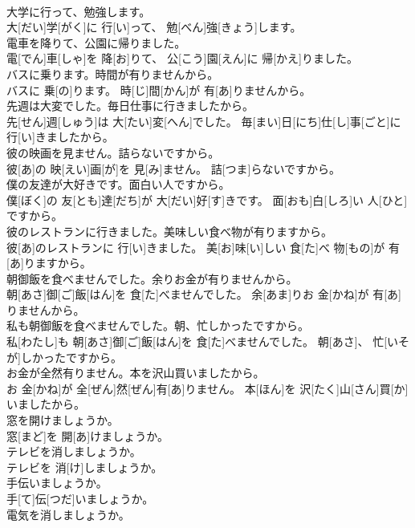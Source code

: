 \documentclass[8pt]{extreport}
\begin{document}
\begin{CJK}{UTF8}{min}
\\	大学に行って、勉強します。	
\\	大[だい]学[がく]に 行[い]って、 勉[べん]強[きょう]します。
\\	電車を降りて、公園に帰りました。	
\\	電[でん]車[しゃ]を 降[お]りて、 公[こう]園[えん]に 帰[かえ]りました。
\\	バスに乗ります。時間が有りませんから。	
\\	バスに 乗[の]ります。 時[じ]間[かん]が 有[あ]りませんから。
\\	先週は大変でした。毎日仕事に行きましたから。	
\\	先[せん]週[しゅう]は 大[たい]変[へん]でした。 毎[まい]日[にち]仕[し]事[ごと]に 行[い]きましたから。
\\	彼の映画を見ません。詰らないですから。	
\\	彼[あ]の 映[えい]画[が]を 見[み]ません。 詰[つま]らないですから。
\\	僕の友達が大好きです。面白い人ですから。	
\\	僕[ぼく]の 友[とも]達[だち]が 大[だい]好[す]きです。 面[おも]白[しろ]い 人[ひと]ですから。
\\	彼のレストランに行きました。美味しい食べ物が有りますから。	
\\	彼[あ]のレストランに 行[い]きました。 美[お]味[い]しい 食[た]べ 物[もの]が 有[あ]りますから。
\\	朝御飯を食べませんでした。余りお金が有りませんから。	
\\	朝[あさ]御[ご]飯[はん]を 食[た]べませんでした。 余[あま]りお 金[かね]が 有[あ]りませんから。
\\	私も朝御飯を食べませんでした。朝、忙しかったですから。	
\\	私[わたし]も 朝[あさ]御[ご]飯[はん]を 食[た]べませんでした。 朝[あさ]、 忙[いそが]しかったですから。
\\	お金が全然有りません。本を沢山買いましたから。	
\\	お 金[かね]が 全[ぜん]然[ぜん]有[あ]りません。 本[ほん]を 沢[たく]山[さん]買[か]いましたから。
\\	窓を開けましょうか。	
\\	窓[まど]を 開[あ]けましょうか。
\\	テレビを消しましょうか。	
\\	テレビを 消[け]しましょうか。
\\	手伝いましょうか。	
\\	手[て]伝[つだ]いましょうか。
\\	電気を消しましょうか。	

\end{CJK}
\end{document}
